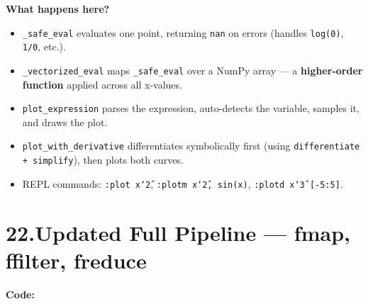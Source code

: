 \documentclass[12pt, a4paper]{article}
\begin{document}
\textbf{What happens here?}
\begin{itemize}
    \item \texttt{\_safe\_eval} evaluates one point, returning \texttt{nan} on errors (handles \texttt{log(0)}, \texttt{1/0}, etc.).
    \item \texttt{\_vectorized\_eval} maps \texttt{\_safe\_eval} over a NumPy array --- a \textbf{higher-order function} applied across all x-values.
    \item \texttt{plot\_expression} parses the expression, auto-detects the variable, samples it, and draws the plot.
    \item \texttt{plot\_with\_derivative} differentiates symbolically first (using \texttt{differentiate + simplify}), then plots both curves.
    \item REPL commands: \texttt{:plot x\char`\^2}, \texttt{:plotm x\char`\^2, sin(x)}, \texttt{:plotd x\char`\^3 [-5:5]}.
\end{itemize}

\newpage
\section{22.\quad Updated Full Pipeline --- fmap, ffilter, freduce}

\textbf{Code:}
\end{document}
